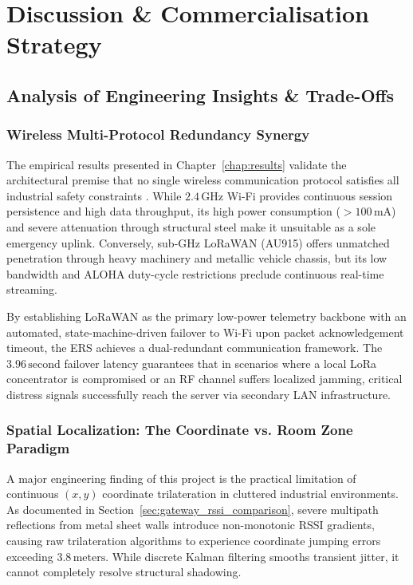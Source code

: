 \chapter{Discussion \& Commercialisation Strategy}
\label{chap:discussion}

\section{Analysis of Engineering Insights \& Trade-Offs}

\subsection{Wireless Multi-Protocol Redundancy Synergy}
The empirical results presented in Chapter~\ref{chap:results} validate the architectural premise that no single wireless communication protocol satisfies all industrial safety constraints \cite{wifi_lora_synergy}. While $2.4\,\text{GHz}$ Wi-Fi provides continuous session persistence and high data throughput, its high power consumption ($>100\,\text{mA}$) and severe attenuation through structural steel make it unsuitable as a sole emergency uplink. Conversely, sub-GHz LoRaWAN (AU915) offers unmatched penetration through heavy machinery and metallic vehicle chassis, but its low bandwidth and ALOHA duty-cycle restrictions preclude continuous real-time streaming.

By establishing LoRaWAN as the primary low-power telemetry backbone with an automated, state-machine-driven failover to Wi-Fi upon packet acknowledgement timeout, the ERS achieves a dual-redundant communication framework. The $3.96\,\text{second}$ failover latency guarantees that in scenarios where a local LoRa concentrator is compromised or an RF channel suffers localized jamming, critical distress signals successfully reach the server via secondary LAN infrastructure.

\subsection{Spatial Localization: The Coordinate vs. Room Zone Paradigm}
A major engineering finding of this project is the practical limitation of continuous $(x, y)$ coordinate trilateration in cluttered industrial environments. As documented in Section~\ref{sec:gateway_rssi_comparison}, severe multipath reflections from metal sheet walls introduce non-monotonic RSSI gradients, causing raw trilateration algorithms to experience coordinate jumping errors exceeding $3.8\,\text{meters}$. While discrete Kalman filtering smooths transient jitter, it cannot completely resolve structural shadowing.

